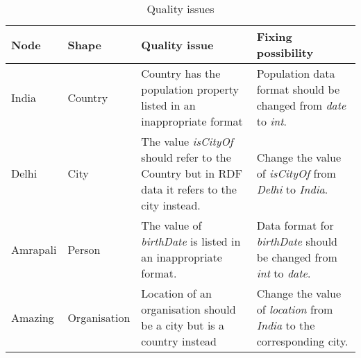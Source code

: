 \documentclass[11pt]{article}
\begin{document}
\begin{table}[H]
    \centering
    \begin{tabularx}{\textwidth}{|l|l|X|X|}
            \hline
\textbf{Node}  & \textbf{Shape} & \textbf{Quality issue}& \textbf{Fixing possibility} \\
        \hline        \hline
    India & Country & Country has the population property listed in an inappropriate format & Population data format should be changed from \textit{date} to \textit{int}. \\
    \hline
    Delhi &  City & The value \textit{isCityOf} should refer to the Country but in RDF data it refers to the city instead. & Change the value of \textit{isCityOf} from \textit{Delhi} to \textit{India}.\\
        \hline
    Amrapali & Person & The value of \textit{birthDate} is listed in an inappropriate format. & Data format for \textit{birthDate} should be changed from \textit{int} to \textit{date}. \\
            \hline
    Amazing & Organisation & Location of an organisation should be a city but is a country instead & Change the value of \textit{location} from \textit{India} to the corresponding city. \\
        \hline
    \end{tabularx}
    \caption{Quality issues}
    \label{tab:table1}
\end{table}
\end{document}
